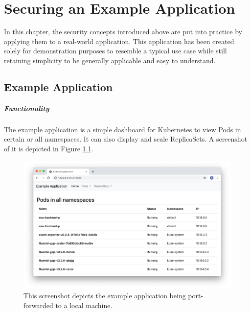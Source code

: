 \chapter{Securing an Example Application} \label{chap:example}

In this chapter, the security concepts introduced above are put into practice by applying them to a real-world application. This application has been created solely for demonstration purposes to resemble a typical use case while still retaining simplicity to be generally applicable and easy to understand.

\section{Example Application}

\paragraph{Functionality}

The example application is a simple dashboard for Kubernetes to view Pods in certain or all namespaces. It can also display and scale ReplicaSets. A screenshot of it is depicted in Figure \ref{fig:exaScreenshot}.

\begin{figure}[H]
\begin{center}
    \includegraphics[width=1.0\linewidth]{figures/exa_screenshot.png}
    \caption[Screenshot of the example application]{This screenshot depicts the example application being port-forwarded to a local machine.}
    \label{fig:exaScreenshot}
\end{center}
\end{figure}

